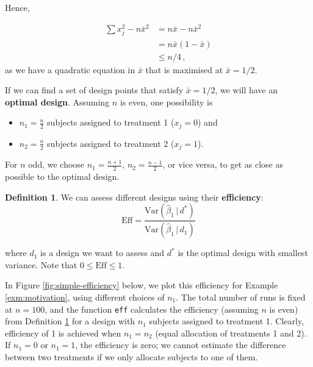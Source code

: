 \documentclass[
]{book}
\providecommand{\tightlist}{%
  \setlength{\itemsep}{0pt}\setlength{\parskip}{0pt}}
\theoremstyle{definition}
\newtheorem{definition}{Definition}[chapter]
\theoremstyle{definition}
\theoremstyle{definition}
\theoremstyle{definition}
\theoremstyle{remark}
\begin{document}
Hence,

\begin{align*}
\sum x_j^{2} - n\bar{x}^2 & = n\bar{x} - n\bar{x}^2 \\
& = n\bar{x}(1-\bar{x}) \\
& \le n/4\,,
\end{align*}
as we have a quadratic equation in \(\bar{x}\) that is maximised at \(\bar{x} = 1/2\).

If we can find a set of design points that satisfy \(\bar{x} = 1/2\), we will have an \textbf{optimal design}. Assuming \(n\) is even, one possibility is

\begin{itemize}
\tightlist
\item
  \(n_{1}=\frac{n}{2}\) subjects assigned to treatment 1 (\(x_j = 0\)) and
\item
  \(n_{2}=\frac{n}{2}\) subjects assigned to treatment 2 (\(x_j = 1\)).
\end{itemize}

For \(n\) odd, we choose \(n_{1}=\frac{n+1}{2}\), \(n_{2}=\frac{n-1}{2}\), or vice versa, to get as close as possible to the optimal design.

\begin{definition}
\protect\hypertarget{def:simple-efficiency}{}\label{def:simple-efficiency}We can assess different designs using their \textbf{efficiency}:
\begin{equation}
\textrm{Eff}=\frac{\textrm{Var}(\hat{\beta}_{1}\, |\, d^{*})}{\textrm{Var}(\hat{\beta}_{1}\, |\, d_{1})}
\label{eq:simple-efficiency}
\end{equation}

where \(d_{1}\) is a design we want to assess and \(d^{*}\) is the optimal design with smallest variance. Note that \(0\leq\textrm{Eff}\leq 1\).
\end{definition}

In Figure \ref{fig:simple-efficiency} below, we plot this efficiency for Example \ref{exm:motivation}, using different choices of \(n_1\). The total number of runs is fixed at \(n = 100\), and the function \texttt{eff} calculates the efficiency (assuming \(n\) is even) from Definition \ref{def:simple-efficiency} for a design with \(n_1\) subjects assigned to treatment 1. Clearly, efficiency of 1 is achieved when \(n_1 = n_2\) (equal allocation of treatments 1 and 2). If \(n_1=0\) or \(n_1 = 1\), the efficiency is zero; we cannot estimate the difference between two treatments if we only allocate subjects to one of them.
\end{document}
